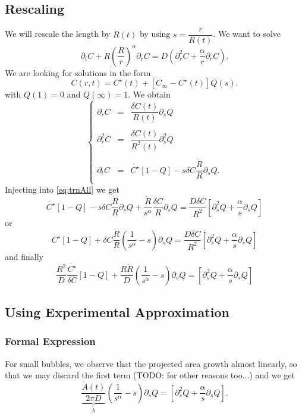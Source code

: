 \documentclass[11pt]{revtex4}
\begin{document}
\subsection{Rescaling}
We will rescale the length by $R(t)$ by using $s=\dfrac{r}{R(t)}$.
We want to solve
\begin{equation}
	\label{eq:trnAll}
	\partial_t C + \dot{R}\left(\dfrac{R}{r}\right)^\alpha \partial_r C = D\left(\partial_r^2 C+ \dfrac{\alpha}{r} \partial_r C \right).
\end{equation}
We are looking for solutions in the form
\begin{equation}
	C(r,t) = C^\star(t) + \left[ C_\infty - C^\star(t)\right] Q(s).
\end{equation}
with $Q(1)=0$ and $Q(\infty)=1$.
We obtain
$$
	\left\lbrace
	\begin{array}{rcl}
	\partial_r C   & = & \dfrac{\delta C(t)}{R(t)}\partial_s Q\\
	\\
	\partial_r^2 C & = & \dfrac{\delta C(t)}{R^2(t)}\partial_s^2 Q\\
	\\
	\partial_t  C  & = & \dot{C^\star}\left[1-Q\right] - s \delta C  \dfrac{\dot{R}}{R} \partial_s Q.\\
	\end{array}
	\right.
$$
Injecting into \eqref{eq:trnAll} we get
$$
	\dot{C^\star}\left[1-Q\right] - s \delta C  \dfrac{\dot{R}}{R} \partial_s Q
	+ \dfrac{\dot{R}}{s^\alpha}  \dfrac{\delta C}{R}\partial_s Q = \dfrac{D\delta C}{R^2}\left[ \partial_s^2 Q + \dfrac{\alpha}{s}\partial_s Q\right]
$$
or
$$
	\dot{C^\star}\left[1-Q\right] + \delta C \dfrac{\dot{R}}{R} \left( \dfrac{1}{s^\alpha} -s \right) \partial_s Q = \dfrac{D\delta C}{R^2}\left[ \partial_s^2 Q + \dfrac{\alpha}{s}\partial_s Q\right]
$$
and finally
\begin{equation}
	\dfrac{R^2}{D} \dfrac{\dot{C^\star}}{\delta C} \left[1-Q\right] + \dfrac{R\dot{R}}{D} \left( \dfrac{1}{s^\alpha} -s \right) \partial_s Q = \left[ \partial_s^2 Q + \dfrac{\alpha}{s}\partial_s Q\right]
\end{equation}

\subsection{Using Experimental Approximation}
\subsubsection{Formal Expression}
For small bubbles, we observe that the projected area growth almost linearly, so that we may discard the first term (TODO: for other reasons too...)
and we get
\begin{equation}
	\underbrace{\dfrac{\dot{A}(t)}{2\pi D}}_{\dot{\lambda}} \left( \dfrac{1}{s^\alpha} -s \right) \partial_s Q = \left[ \partial_s^2 Q + \dfrac{\alpha}{s}\partial_s Q\right].
\end{equation}
\end{document}

